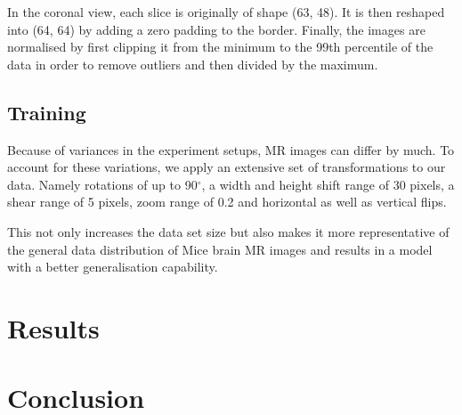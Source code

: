 \documentclass{article}
\begin{document}
In the coronal view, each slice is originally of shape (63, 48).
It is then reshaped into (64, 64) by adding a zero padding to the border.
Finally, the images are normalised by first clipping it from the minimum to the 99th percentile of the data in order to remove outliers and then divided by the maximum.

\subsection{Training}

Because of variances in the experiment setups, MR images can differ by much. 
To account for these variations, we apply an extensive set of transformations to our data. Namely rotations of up to 90$^{\circ}$, a width and height shift range of 30 pixels, a shear range of 5 pixels, zoom range of 0.2 and horizontal as well as vertical flips.

This not only increases the data set size but also makes it more representative of the general data distribution of Mice brain MR images and results in a model with a better generalisation capability.

\section{Results}

\section{Conclusion}




\end{document}
